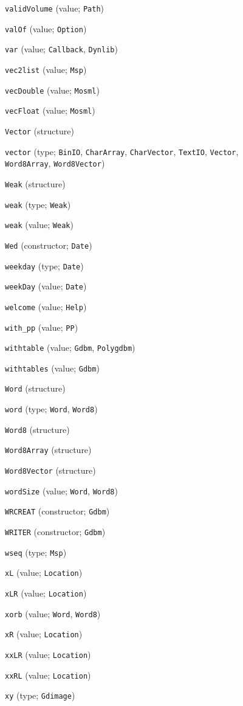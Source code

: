 \begin{description}
\item[] \verb"validVolume" (value; \verb"Path")
\item[] \verb"valOf" (value; \verb"Option")
\item[] \verb"var" (value; \verb"Callback", \verb"Dynlib")
\item[] \verb"vec2list" (value; \verb"Msp")
\item[] \verb"vecDouble" (value; \verb"Mosml")
\item[] \verb"vecFloat" (value; \verb"Mosml")
\item[] \verb"Vector" (structure)
\item[] \verb"vector" (type; \verb"BinIO", \verb"CharArray", \verb"CharVector", \verb"TextIO", \verb"Vector", \verb"Word8Array", \verb"Word8Vector")
\\[2ex]

\item[] \verb"Weak" (structure)
\item[] \verb"weak" (type; \verb"Weak")
\item[] \verb"weak" (value; \verb"Weak")
\item[] \verb"Wed" (constructor; \verb"Date")
\item[] \verb"weekday" (type; \verb"Date")
\item[] \verb"weekDay" (value; \verb"Date")
\item[] \verb"welcome" (value; \verb"Help")
\item[] \verb"with_pp" (value; \verb"PP")
\item[] \verb"withtable" (value; \verb"Gdbm", \verb"Polygdbm")
\item[] \verb"withtables" (value; \verb"Gdbm")
\item[] \verb"Word" (structure)
\item[] \verb"word" (type; \verb"Word", \verb"Word8")
\item[] \verb"Word8" (structure)
\item[] \verb"Word8Array" (structure)
\item[] \verb"Word8Vector" (structure)
\item[] \verb"wordSize" (value; \verb"Word", \verb"Word8")
\item[] \verb"WRCREAT" (constructor; \verb"Gdbm")
\item[] \verb"WRITER" (constructor; \verb"Gdbm")
\item[] \verb"wseq" (type; \verb"Msp")
\\[2ex]

\item[] \verb"xL" (value; \verb"Location")
\item[] \verb"xLR" (value; \verb"Location")
\item[] \verb"xorb" (value; \verb"Word", \verb"Word8")
\item[] \verb"xR" (value; \verb"Location")
\item[] \verb"xxLR" (value; \verb"Location")
\item[] \verb"xxRL" (value; \verb"Location")
\item[] \verb"xy" (type; \verb"Gdimage")
\\[2ex]


\end{description}
